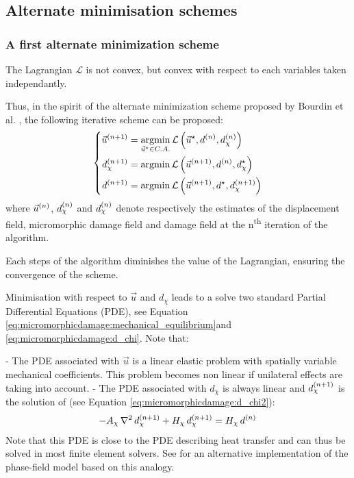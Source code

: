 \subsection{Alternate minimisation schemes}
\label{sec:micromorphicdamage:alternate_minimisation}

\subsubsection{A first alternate minimization scheme}

The Lagrangian \(\mathcal{L}\) is not convex, but convex with respect to
each variables taken independantly.

Thus, in the spirit of the alternate minimization scheme proposed by
Bourdin et al. \cite{bourdin_numerical_2000}, the following iterative scheme
can be proposed:
\[
\left\{
\begin{aligned}
\iter{n+1}{\vec{u}} &= \underset{\vec{u}^{\star}\in C.A.}{\argmin}\, \mathcal{L}\paren{\vec{u}^{\star},\iter{n}{d},\iter{n}{d_{\chi}}}\\
\iter{n+1}{d_{\chi}} &= \argmin \,\mathcal{L}\paren{\iter{n+1}{\vec{u}},\iter{n}{d},d_{\chi}^{\star}} \\
\iter{n+1}{d} &= \argmin \,\mathcal{L}\paren{\iter{n+1}{\vec{u}},d^{\star},\iter{n+1}{d_{\chi}}} \\
\end{aligned}
\right.
\]
where \(\iter{n}{\vec{u}}\), \(\iter{n}{d_{\chi}}\) and
\(\iter{n}{d_{\chi}}\) denote respectively the estimates of the
displacement field, micromorphic damage field and damage field at the
n\textsuperscript{th} iteration of the algorithm.

Each steps of the algorithm diminishes the value of the Lagrangian,
ensuring the convergence of the scheme.

Minimisation with respect to \(\vec{u}\) and \(d_{\chi}\) leads to a
solve two standard Partial Differential Equations (PDE), see Equation
\eqref{eq:micromorphicdamage:mechanical_equilibrium}and
\eqref{eq:micromorphicdamage:d_chi}. Note that:

- The PDE associated with \(\vec{u}\) is a linear elastic problem with
  spatially variable mechanical coefficients. This problem becomes non
  linear if unilateral effects are taking into account.
- The PDE associated with \(d_{\chi}\) is always linear and
  \(\iter{n+1}{d_{\chi}}\) is the solution of (see Equation
  \eqref{eq:micromorphicdamage:d_chi2}):
  \[
  -A_{\chi}\,\LaplacianOperator\,\iter{n+1}{d_{\chi}}+H_{\chi}\,\iter{n+1}{d_{\chi}}=
  H_{\chi}\,\iter{n}{d}
  \]
  Note that this PDE is close to the PDE describing heat transfer and can
  thus be solved in most finite element solvers. See \cite{azinpour_simple_2018}
  for an alternative implementation of the phase-field model based on this analogy.


